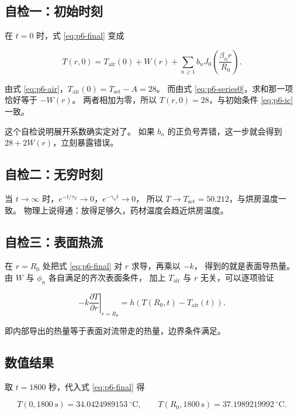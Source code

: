 \subsection{自检一：初始时刻}

在 $t=0$ 时，式 \eqref{eq:p6-final} 变成

\begin{equation}
T(r,0)=T_{\mathrm{air}}(0)+W(r)+\sum_{n\ge1}b_nJ_0\!\left(\frac{\beta_n r}{R_0}\right).
\end{equation}

由式 \eqref{eq:p6-air}，$T_{\mathrm{air}}(0)=T_{\mathrm{set}}-A=28$。
而由式 \eqref{eq:p6-series0}，求和那一项恰好等于 $-W(r)$。
两者相加为零，所以 $T(r,0)=28$，与初始条件 \eqref{eq:p6-ic} 一致。

这个自检说明展开系数确实定对了。
如果 $b_n$ 的正负号弄错，这一步就会得到 $28+2W(r)$，立刻暴露错误。

\subsection{自检二：无穷时刻}

当 $t\to\infty$ 时，$e^{-t/\tau_T}\to0$，$e^{-\gamma_n t}\to0$，
所以 $T\to T_{\mathrm{set}}=50.212$，与烘房温度一致。
物理上说得通：放得足够久，药材温度会趋近烘房温度。

\subsection{自检三：表面热流}

在 $r=R_0$ 处把式 \eqref{eq:p6-final} 对 $r$ 求导，再乘以 $-k$，
得到的就是表面导热量。由 $W$ 与 $\phi_n$ 各自满足的齐次表面条件，
加上 $T_{\mathrm{air}}$ 与 $r$ 无关，可以逐项验证

\begin{equation}
-k\left.\frac{\partial T}{\partial r}\right|_{r=R_0}
=h\left(T(R_0,t)-T_{\mathrm{air}}(t)\right).
\end{equation}

即内部导出的热量等于表面对流带走的热量，边界条件满足。

\subsection{数值结果}

取 $t=1800$ 秒，代入式 \eqref{eq:p6-final} 得

\begin{equation}
T(0,1800\ \mathrm{s})=34.0424989153\ ^\circ\mathrm{C},
\qquad
T(R_0,1800\ \mathrm{s})=37.1989219992\ ^\circ\mathrm{C}.
\end{equation}

